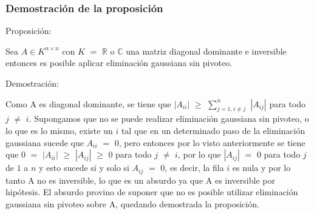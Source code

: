 \subsubsection{Demostración de la proposición}
Proposición:

Sea $A \in K^{n \times n}$ con $K$ $=$ $\mathbb{R}$ o $\mathbb{C}$ una matriz diagonal dominante e inversible entonces es posible aplicar eliminación gaussiana sin pivoteo.

Demostración:

Como A es diagonal dominante, se tiene que $|A_{ii}|$ $\geq$ $\sum_{j=1, i \neq j}^{n}$ $|A_{ij}|$ para todo $j$ $\neq$ $i$. Supongamos que no se puede realizar eliminación gaussiana sin pivoteo, o lo que es lo mismo, existe un $i$ tal que en un determinado paso de la eliminación gaussiana sucede que $A_{ii}$ $=$ $0$, pero entonces por lo visto anteriormente se tiene que $0$ $=$ $|A_{ii}|$ $\geq$ $|A_{ij}|$  $\geq$ $0$ para todo $j$ $\neq$ $i$, por lo que $|A_{ij}|$ $=$ $0$ para todo $j$ de $1$ a $n$ y esto sucede si y solo si $A_{ij}$ $=$ $0$, es decir, la fila $i$ es nula y por lo tanto A no es inversible, lo que es un absurdo ya que A es inversible por hipótesis. El absurdo provino de suponer que no es posible utilizar eliminación gaussiana sin pivoteo sobre A, quedando demostrada la proposición.

